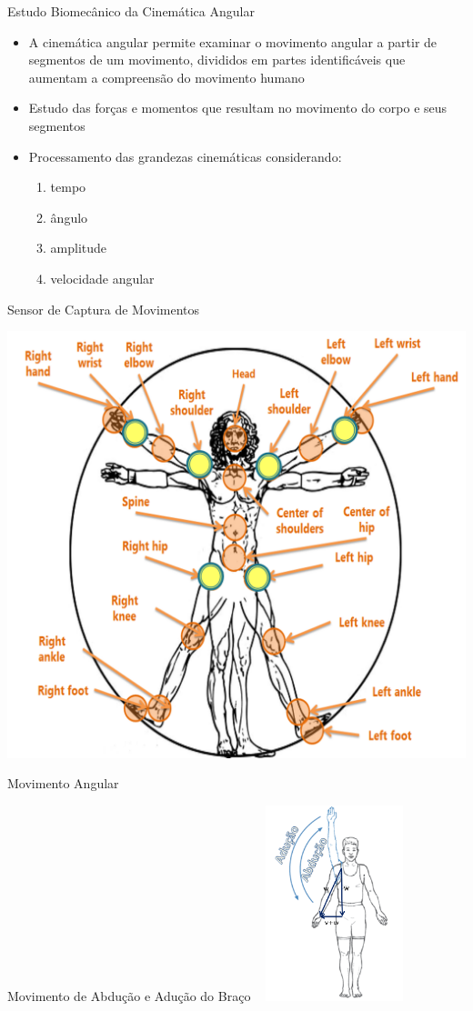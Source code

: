 \documentclass{beamer}
\begin{document}
\begin{frame}{Estudo Biomecânico da Cinemática Angular}
  \begin{block}{}
      \begin{itemize}
	 \item A cinemática angular permite examinar o movimento angular a partir de segmentos de um movimento, divididos em partes identificáveis que aumentam a compreensão do movimento humano  
	 \item Estudo das forças e momentos que resultam no movimento do corpo e seus segmentos
	 \item Processamento das grandezas cinemáticas considerando: 
	    \begin{enumerate}
	      \item tempo
	      \item ângulo
	      \item amplitude
	      \item velocidade angular
	    \end{enumerate}
       \end{itemize}
  \end{block}
\end{frame}


\begin{frame}{Sensor de Captura de Movimentos}
  \begin{block}{}
      \center \includegraphics[height=2.5 in]{img/articulacoes-sel.png}
  \end{block}
\end{frame}

\begin{frame}{Movimento Angular}
  \begin{block}{Movimento de Abdução e Adução do Braço ~\cite{mcginnis2013biomechanics}}
      \center \includegraphics[width=4cm]{img/abducao-angulo.png}
  \end{block}
\end{frame}
\end{document}

